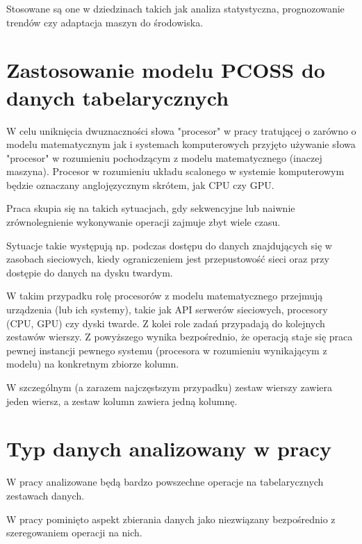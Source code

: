 \documentclass[brudnopis]{xmgr}
\begin{document}
Stosowane są one w dziedzinach takich jak analiza statystyczna, prognozowanie trendów czy adaptacja maszyn do środowiska.


\chapter{Zastosowanie modelu PCOSS do danych tabelarycznych}

W celu uniknięcia dwuznaczności słowa "procesor" w pracy tratującej o zarówno o modelu matematycznym jak i systemach komputerowych przyjęto używanie słowa "procesor" w rozumieniu pochodzącym z modelu matematycznego (inaczej maszyna). Procesor w rozumieniu układu scalonego w systemie komputerowym będzie oznaczany anglojęzycznym skrótem, jak CPU czy GPU.

Praca skupia się na takich sytuacjach, gdy sekwencyjne lub naiwnie zrównolegnienie wykonywanie operacji zajmuje zbyt wiele czasu.

Sytuacje takie występują np. podczas dostępu do danych znajdujących się w zasobach sieciowych, kiedy ograniczeniem jest przepustowość sieci oraz przy dostępie do danych na dysku twardym.

W takim przypadku rolę procesorów z modelu matematycznego przejmują urządzenia (lub ich systemy), takie jak API serwerów sieciowych, procesory (CPU, GPU) czy dyski twarde.
Z kolei role zadań przypadają do kolejnych zestawów wierszy.
Z powyższego wynika bezpośrednio, że operacją staje się praca pewnej instancji pewnego systemu (procesora w rozumieniu wynikającym z modelu) na konkretnym zbiorze kolumn.

W szczególnym (a zarazem najczęstszym przypadku) zestaw wierszy zawiera jeden wiersz, a zestaw kolumn zawiera jedną kolumnę.


\chapter{Typ danych analizowany w pracy}

W pracy analizowane będą bardzo powszechne operacje na tabelarycznych zestawach danych.

W pracy pominięto aspekt zbierania danych jako niezwiązany bezpośrednio z szeregowaniem operacji na nich.
\end{document}
